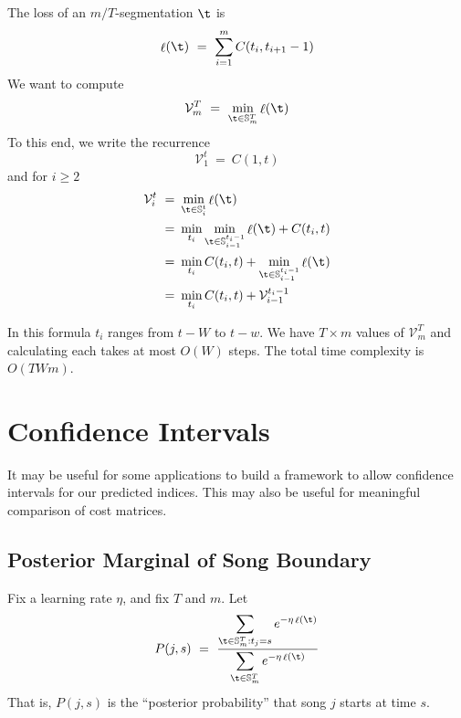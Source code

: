 \documentclass[twocolumn]{article}
\DeclareMathOperator{\loss}{\ell}
\newcommand{\segs}{\mathbb S}
\newcommand{\best}{\mathcal V}
\begin{document}
	The loss of an $m/T$-segmentation $\t$ is 
	\[
	\loss(\t) 
	~=~
	\sum_{i=1}^m C(t_i, t_{i+1}-1)
	\]
	We want to compute
	\[
	\best^T_m ~=~ \min_{\t \in \segs^T_m} \loss(\t)
	\]
	To this end, we write the recurrence
	\begin{equation*}
		\best^t_1 ~=~ C(1, t) 
	\end{equation*}
	and for $i\ge2$
\begin{align*}
		\best^t_i ~=~& \min_{\t \in \segs^t_i} \loss(\t)  \\
		~=~& \min_{t_i} \min_{\t \in \segs^{t_i-1}_{i-1}} \loss(\t) + C(t_i, t)  \\
		~=~&  	\min_{t_i} C(t_i, t) + \min_{\t \in \segs^{t_i-1}_{i-1}} \loss(\t)  \\ 
		~=~& \min_{t_i} C(t_i, t) + \best^{t_i-1}_{i-1} \\
\end{align*}
	
	In this formula $t_i$ ranges from $t-W$ to $t-w$. We have $T \times m$ values of $\best^T_m$ and calculating each takes at most $O(W)$ steps. The total time complexity is $O(TWm)$.
	
\section{Confidence Intervals}\label{sec:confidence-intervals}
	
It may be useful for some applications to build a framework to allow confidence intervals for our predicted indices. This may also be useful for meaningful comparison of cost matrices.
	
	\subsection{Posterior Marginal of Song Boundary}
	Fix a learning rate $\eta$, and fix $T$ and $m$. Let
	\[
	P(j,s) ~=~ 
	\frac{\displaystyle
		\sum_{\t \in \segs^T_m : t_j = s} e^{- \eta \loss(\t)}
	}{\displaystyle
	\sum_{\t \in \segs^T_m} e^{- \eta \loss(\t)}
}
\]
That is, $P(j,s)$ is the ``posterior probability'' that song $j$ starts at time $s$.
\end{document}
